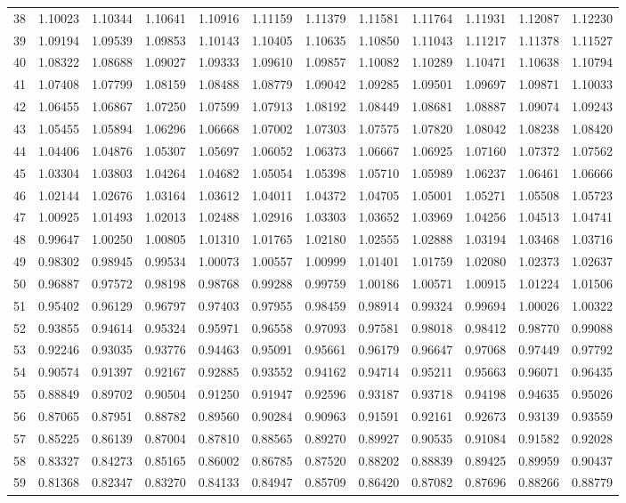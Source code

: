 \begin{center}
\begin{tabular}{|r|rrrrrrrrrrr|}
38&1.10023&1.10344&1.10641&1.10916&1.11159&1.11379&1.11581&1.11764&1.11931&1.12087&1.12230\\
39&1.09194&1.09539&1.09853&1.10143&1.10405&1.10635&1.10850&1.11043&1.11217&1.11378&1.11527\\[5pt]
40&1.08322&1.08688&1.09027&1.09333&1.09610&1.09857&1.10082&1.10289&1.10471&1.10638&1.10794\\
41&1.07408&1.07799&1.08159&1.08488&1.08779&1.09042&1.09285&1.09501&1.09697&1.09871&1.10033\\
42&1.06455&1.06867&1.07250&1.07599&1.07913&1.08192&1.08449&1.08681&1.08887&1.09074&1.09243\\
43&1.05455&1.05894&1.06296&1.06668&1.07002&1.07303&1.07575&1.07820&1.08042&1.08238&1.08420\\
44&1.04406&1.04876&1.05307&1.05697&1.06052&1.06373&1.06667&1.06925&1.07160&1.07372&1.07562\\[5pt]
45&1.03304&1.03803&1.04264&1.04682&1.05054&1.05398&1.05710&1.05989&1.06237&1.06461&1.06666\\
46&1.02144&1.02676&1.03164&1.03612&1.04011&1.04372&1.04705&1.05001&1.05271&1.05508&1.05723\\
47&1.00925&1.01493&1.02013&1.02488&1.02916&1.03303&1.03652&1.03969&1.04256&1.04513&1.04741\\
48&0.99647&1.00250&1.00805&1.01310&1.01765&1.02180&1.02555&1.02888&1.03194&1.03468&1.03716\\
49&0.98302&0.98945&0.99534&1.00073&1.00557&1.00999&1.01401&1.01759&1.02080&1.02373&1.02637\\[5pt]
50&0.96887&0.97572&0.98198&0.98768&0.99288&0.99759&1.00186&1.00571&1.00915&1.01224&1.01506\\
51&0.95402&0.96129&0.96797&0.97403&0.97955&0.98459&0.98914&0.99324&0.99694&1.00026&1.00322\\
52&0.93855&0.94614&0.95324&0.95971&0.96558&0.97093&0.97581&0.98018&0.98412&0.98770&0.99088\\
53&0.92246&0.93035&0.93776&0.94463&0.95091&0.95661&0.96179&0.96647&0.97068&0.97449&0.97792\\
54&0.90574&0.91397&0.92167&0.92885&0.93552&0.94162&0.94714&0.95211&0.95663&0.96071&0.96435\\[5pt]
55&0.88849&0.89702&0.90504&0.91250&0.91947&0.92596&0.93187&0.93718&0.94198&0.94635&0.95026\\
56&0.87065&0.87951&0.88782&0.89560&0.90284&0.90963&0.91591&0.92161&0.92673&0.93139&0.93559\\
57&0.85225&0.86139&0.87004&0.87810&0.88565&0.89270&0.89927&0.90535&0.91084&0.91582&0.92028\\
58&0.83327&0.84273&0.85165&0.86002&0.86785&0.87520&0.88202&0.88839&0.89425&0.89959&0.90437\\
59&0.81368&0.82347&0.83270&0.84133&0.84947&0.85709&0.86420&0.87082&0.87696&0.88266&0.88779\\
\hline\end{tabular}
\end{center}
